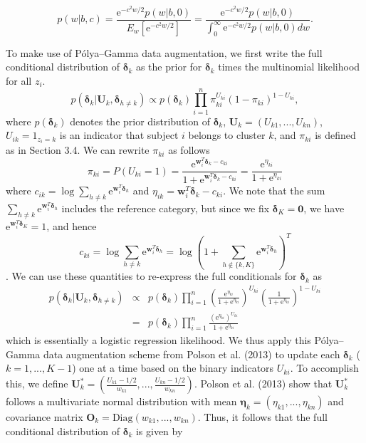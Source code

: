 \documentclass[useAMS,referee]{biom}
\begin{document}
\begin{equation}
	p({w}|b,c) = \frac{\text{e}^{-c^2{w}/2}p({w}|b,0)}{E_{{w}}[\text{e}^{-c^2{w}/2}]} = \frac{\text{e}^{-c^2{w}/2}p({w}|b,0)}{\int_0^\infty \text{e}^{-c^2{w}/2}p({w}|b,0)d{w}}. \label{eq:pg3}
\end{equation}

To make use of P\'olya--Gamma data augmentation, we first write the full conditional distribution of $\boldsymbol\delta_k$ as the prior for $\boldsymbol\delta_k$ times the multinomial likelihood for all $z_i$. $$p(\boldsymbol\delta_k|\mathbf{U}_k,\boldsymbol\delta_{h \ne k}) \propto p(\boldsymbol\delta_k) \prod_{i = 1}^{n} \pi_{ki}^{U_{ki}}(1-\pi_{ki})^{1-U_{ki}},$$
where $p(\boldsymbol\delta_k)$ denotes the prior distribution of $\boldsymbol\delta_k$, $\mathbf{U}_k = (U_{k1},...,U_{kn})$, $U_{ik} = {1}_{z_i = k}$ is an indicator that subject $i$ belongs to cluster $k$, and $\pi_{ki}$ is defined as in Section 3.4. We can rewrite $\pi_{ki}$ as follows
$$\pi_{ki} = P(U_{ki} = 1) = \frac{\text{e}^{\mathbf{w}_i^T \boldsymbol\delta_k - {c}_{ki}}}{1 + \text{e}^{\mathbf{w}_i^T \boldsymbol\delta_k - {c}_{ki}}} = \frac{\text{e}^{\eta_{ki}}}{1 + \text{e}^{\eta_{ki}}}$$
where ${c}_{ik} = \log \sum_{h \ne k} \text{e}^{\mathbf{w}_i^T \boldsymbol\delta_{h}}$ and $\eta_{ik} = \mathbf{w}_i^T \boldsymbol\delta_k - {c}_{ki}$. We note that the sum $\sum_{h \ne k} \text{e}^{\mathbf{w}_i^T \boldsymbol\delta_{h}}$ includes the reference category, but since we fix $\boldsymbol\delta_K = \mathbf{0}$, we have $\text{e}^{\mathbf{w}_i^T \boldsymbol\delta_K} = 1$, and hence
$$c_{ki} = \log \sum_{h \ne k} \text{e}^{\mathbf{w}_i^T \boldsymbol\delta_{h}} = \log \left ( 1 + \sum_{h \notin \{k,K \}} \text{e}^{\mathbf{w}_i^T \boldsymbol\delta_{h}} \right )^T$$. 
We can use these quantities to re-express the full conditionals for $\boldsymbol\delta_k$ as
\begin{eqnarray}
	p(\boldsymbol\delta_k|\mathbf{U}_k,\boldsymbol\delta_{h \ne k}) &\propto& p(\boldsymbol\delta_k) \prod_{i = 1}^{n} \left (\frac{\text{e}^{\eta_{ki}}}{1 + \text{e}^{\eta_{ki}}} \right )^{U_{ki}} \left (\frac{1}{1 + \text{e}^{\eta_{ki}}} \right )^{1-U_{ki}} \nonumber\\ &=& p(\boldsymbol\delta_k) \prod_{i = 1}^n \frac{(\text{e}^{\eta_{ki}})^{U_{ki}}}{1 + \text{e}^{\eta_{ki}}} \label{eq:pglogit}
\end{eqnarray}
which is essentially a logistic regression likelihood. We thus apply this P\'olya--Gamma data augmentation scheme from Polson et al. (2013) to update each $\boldsymbol\delta_k$ ($k = 1,...,K-1$) one at a time based on the binary indicators $U_{ki}$. To accomplish this, we define $\mathbf{U}^*_{k} = \left( \frac{U_{k1}-1/2}{w_{k1}},...,\frac{U_{kn}-1/2}{w_{kn}} \right )$. Polson et al. (2013) show that $\mathbf{U}^*_{k}$ follows a multivariate normal distribution with mean $\boldsymbol\eta_k = (\eta_{k1},...,\eta_{kn})$ and covariance matrix $\mathbf{O}_k = \text{Diag}(w_{k1},...,w_{kn})$. Thus, it follows that the full conditional distribution of $\boldsymbol\delta_k$ is given by 
\end{document}
